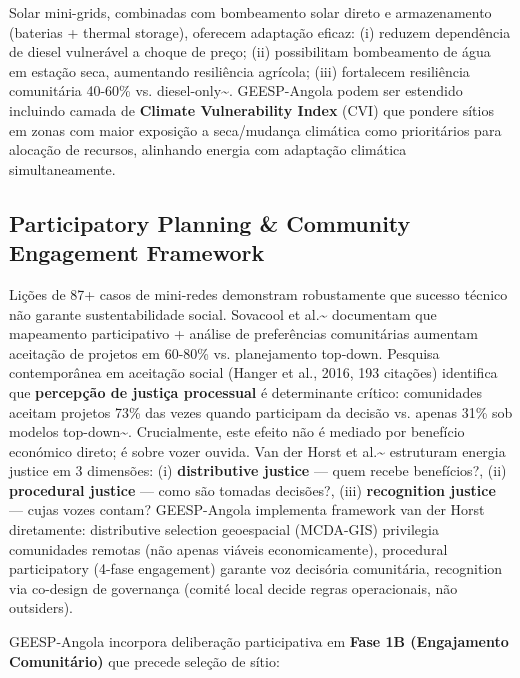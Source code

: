 \documentclass[12pt, a4paper]{article}
\begin{document}
Solar mini-grids, combinadas com bombeamento solar direto e armazenamento (baterias + thermal storage), oferecem adaptação eficaz: (i) reduzem dependência de diesel vulnerável a choque de preço; (ii) possibilitam bombeamento de água em estação seca, aumentando resiliência agrícola; (iii) fortalecem resiliência comunitária 40-60\% vs. diesel-only\textasciitilde{}\citep{Okesiji2025}. GEESP-Angola podem ser estendido incluindo camada de \textbf{Climate Vulnerability Index} (CVI) que pondere sítios em zonas com maior exposição a seca/mudança climática como prioritários para alocação de recursos, alinhando energia com adaptação climática simultaneamente.

\subsection{Participatory Planning \& Community Engagement Framework}

Lições de 87+ casos de mini-redes demonstram robustamente que sucesso técnico não garante sustentabilidade social. Sovacool et al.\textasciitilde{}\citep{Sovacool2020} documentam que mapeamento participativo + análise de preferências comunitárias aumentam aceitação de projetos em 60-80\% vs. planejamento top-down. Pesquisa contemporânea em aceitação social (Hanger et al., 2016, 193 citações) identifica que 
\textbf{percepção de justiça processual} é determinante crítico: comunidades aceitam projetos 73\% das vezes quando participam da decisão vs. apenas 31\% sob modelos top-down\textasciitilde{}\citep{Hanger2016}. Crucialmente, este efeito não é mediado por benefício económico direto; é sobre vozer ouvida. Van der Horst et al.\textasciitilde{}\citep{VanderHorst2021} estruturam energia justice em 3 dimensões: (i) 
\textbf{distributive justice} — quem recebe benefícios?, (ii) 
\textbf{procedural justice} — como são tomadas decisões?, (iii)
\textbf{recognition justice} — cujas vozes contam? GEESP-Angola implementa framework van der Horst diretamente: distributive selection geoespacial (MCDA-GIS) privilegia comunidades remotas (não apenas viáveis economicamente), procedural participatory (4-fase engagement) garante voz decisória comunitária, recognition via co-design de governança (comité local decide regras operacionais, não outsiders).

GEESP-Angola incorpora deliberação participativa em \textbf{Fase 1B (Engajamento Comunitário)} que precede seleção de sítio:
\end{document}
